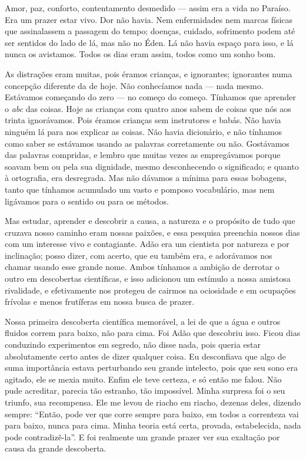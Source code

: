 Amor, paz, conforto, contentamento desmedido --- assim era a vida no Paraíso. Era
um prazer estar vivo. Dor não havia. Nem enfermidades nem marcas físicas que
assinalassem a passagem do tempo; doenças, cuidado, sofrimento podem até ser     
sentidos do lado de lá, mas não no Éden. Lá não havia espaço para isso, e lá
nunca os avistamos. Todos os dias eram assim, todos como um sonho bom.

As distrações eram muitas, pois éramos crianças, e ignorantes; ignorantes numa
concepção diferente da de hoje. Não conhecíamos nada --- nada mesmo. Estávamos
começando do zero --- no começo do começo. Tínhamos que aprender o
\textit{abc} das coisas. Hoje as crianças com quatro anos
sabem de coisas que nós aos trinta ignorávamos. Pois éramos crianças sem
instrutores e babás. Não havia ninguém lá para nos explicar as coisas. Não havia
dicionário, e não tínhamos como saber se estávamos usando as palavras corretamente
ou não. Gostávamos das palavras compridas, e lembro que muitas vezes as
empregávamos porque soavam bem ou pela sua dignidade, mesmo desconhecendo o
significado; e quanto à ortografia, era desregrada. Mas não dávamos a mínima para
essas bobagens, tanto que tínhamos acumulado um vasto e pomposo vocabulário, mas
nem ligávamos para o sentido ou para os métodos.

Mas estudar, aprender e descobrir a causa, a natureza e o propósito de tudo que
cruzava nosso caminho eram nossas paixões, e essa pesquisa preenchia nossos dias
com um interesse vivo e contagiante. Adão era um cientista por natureza e por
inclinação; posso dizer, com acerto, que eu também era, e adorávamos nos chamar
usando esse grande nome. Ambos tínhamos a ambição de derrotar o outro em
descobertas científicas, e isso adicionou um estímulo a nossa amistosa
rivalidade, e efetivamente nos protegeu de cairmos na ociosidade e em ocupações frívolas
e menos frutíferas em nossa busca de prazer.

Nossa primeira descoberta científica memorável, a lei de que a água e outros
fluidos correm para baixo, não para cima. Foi Adão que descobriu isso. Ficou
dias conduzindo experimentos em segredo, não disse nada, pois
queria estar absolutamente certo antes de dizer qualquer coisa. Eu desconfiava que
algo de suma importância estava perturbando seu grande intelecto, pois que seu
sono era agitado, ele se mexia muito. Enfim ele teve certeza,
e só então me falou. Não pude acreditar, parecia tão estranho, tão
impossível. Minha surpresa foi o seu triunfo, sua recompensa. Ele me levou de
riacho em riacho, dezenas deles, dizendo sempre: “Então, pode ver que corre sempre
para baixo, em todos a correnteza vai para baixo, nunca para cima. Minha
teoria está certa, provada, estabelecida, nada pode contradizê-la”. E foi
realmente um grande prazer ver sua exaltação por causa da grande descoberta.

